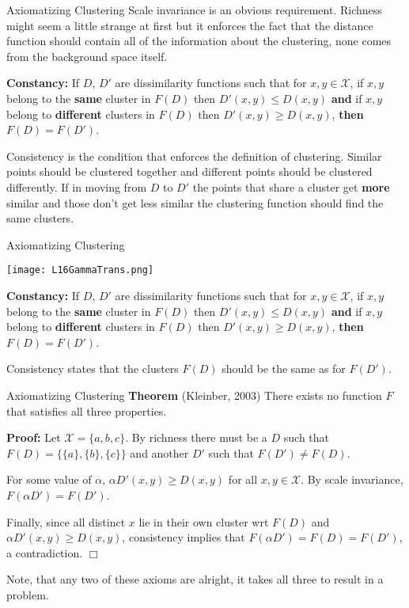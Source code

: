 \documentclass[10pt, table, dvipsnames,xcdraw,handout]{beamer}
\newcommand{\cX}{\ensuremath{\mathcal{X}}}
\begin{document}
\begin{frame}[fragile]{Axiomatizing Clustering}
Scale invariance is an obvious requirement. Richness might seem a little strange at first but it enforces the fact that the distance function should contain all of the information about the clustering, none comes from the background space itself. \pause

\textbf{Constancy:} If $D$, $D'$ are dissimilarity functions such that for $x,y\in \cX$, if $x,y$ belong to the \textbf{same} cluster in $F(D)$ then $D'(x,y)\leq D(x,y)$ \textbf{and} if $x,y$ belong to \textbf{different} clusters in $F(D)$ then $D'(x,y)\geq D(x,y)$, \textbf{then} $F(D) = F(D')$.  \pause

Consistency is the condition that enforces the definition of clustering. Similar points should be clustered together and different points should be clustered differently. If in moving from $D$ to $D'$ the points that share a cluster get \textbf{more} similar and those don't get less similar the clustering function should find the same clusters. 

\end{frame}


\begin{frame}[fragile]{Axiomatizing Clustering}
  \begin{minipage}[t][0.5\textheight][t]{\textwidth}
	\centering \texttt{[image: L16GammaTrans.png]}
  \end{minipage}
  \vfill
\begin{minipage}[t][0.5\textheight][t]{\textwidth}
\textbf{Constancy:} If $D$, $D'$ are dissimilarity functions such that for $x,y\in \cX$, if $x,y$ belong to the \textbf{same} cluster in $F(D)$ then $D'(x,y)\leq D(x,y)$ \textbf{and} if $x,y$ belong to \textbf{different} clusters in $F(D)$ then $D'(x,y)\geq D(x,y)$, \textbf{then} $F(D) = F(D')$. 

Consistency states that the clusters $F(D)$ should be the same as for $F(D')$. 
\end{minipage}
\end{frame}





\begin{frame}[fragile]{Axiomatizing Clustering}
\textbf{Theorem} (Kleinber, 2003) There exists no function $F$ that satisfies all three properties. \pause\newline

\textbf{Proof:} Let $\cX = \{a,b,c\}$. By richness there must be a $D$ such that $F(D) = \{\{a\},\{b\},\{c\}\}$ and another $D'$ such that $F(D') \neq F(D)$. \pause

For some value of $\alpha$, $\alpha D'(x,y)\geq D(x,y)$ for all $x,y\in \cX$. By scale invariance, $F(\alpha D') = F(D')$. \pause 

Finally, since all distinct $x$ lie in their own cluster wrt $F(D)$ and $\alpha D'(x,y) \geq D(x,y)$, consistency implies that $F(\alpha D') = F(D) = F(D')$, a contradiction. $\Box$ \pause

Note, that any two of these axioms are alright, it takes all three to result in a problem. 
\end{frame}
\end{document}
